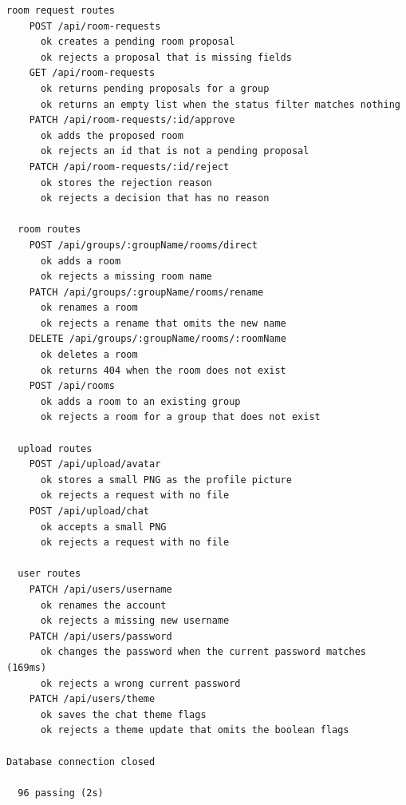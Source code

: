 \documentclass[10pt,a4paper]{article}
\begin{document}
\begin{Verbatim}[fontsize=\scriptsize,breaklines,frame=single]
  room request routes
    POST /api/room-requests
      ok creates a pending room proposal
      ok rejects a proposal that is missing fields
    GET /api/room-requests
      ok returns pending proposals for a group
      ok returns an empty list when the status filter matches nothing
    PATCH /api/room-requests/:id/approve
      ok adds the proposed room
      ok rejects an id that is not a pending proposal
    PATCH /api/room-requests/:id/reject
      ok stores the rejection reason
      ok rejects a decision that has no reason

  room routes
    POST /api/groups/:groupName/rooms/direct
      ok adds a room
      ok rejects a missing room name
    PATCH /api/groups/:groupName/rooms/rename
      ok renames a room
      ok rejects a rename that omits the new name
    DELETE /api/groups/:groupName/rooms/:roomName
      ok deletes a room
      ok returns 404 when the room does not exist
    POST /api/rooms
      ok adds a room to an existing group
      ok rejects a room for a group that does not exist

  upload routes
    POST /api/upload/avatar
      ok stores a small PNG as the profile picture
      ok rejects a request with no file
    POST /api/upload/chat
      ok accepts a small PNG
      ok rejects a request with no file

  user routes
    PATCH /api/users/username
      ok renames the account
      ok rejects a missing new username
    PATCH /api/users/password
      ok changes the password when the current password matches (169ms)
      ok rejects a wrong current password
    PATCH /api/users/theme
      ok saves the chat theme flags
      ok rejects a theme update that omits the boolean flags

Database connection closed

  96 passing (2s)
\end{Verbatim}
\end{document}
